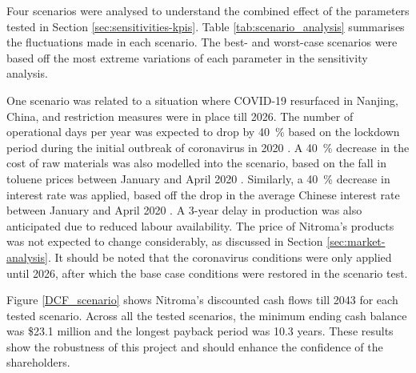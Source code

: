 Four scenarios were analysed to understand the combined effect of the parameters tested in Section \ref{sec:sensitivities-kpis}. Table \ref{tab:scenario_analysis} summarises the fluctuations made in each scenario. The best- and worst-case scenarios were based off the most extreme variations of each parameter in the sensitivity analysis. 

One scenario was related to a situation where COVID-19 resurfaced in Nanjing, China, and restriction measures were in place till 2026. The number of operational days per year was expected to drop by \SI{40}{\percent} based on the lockdown period during the initial outbreak of coronavirus in 2020 \cite{bbc_news_coronavirus_nodate}. A \SI{40}{\percent} decrease in the cost of raw materials was also modelled into the scenario, based on the fall in toluene prices between January and April 2020 \cite{sunsirs_commodity_group_china_2021}. Similarly, a \SI{40}{\percent} decrease in interest rate was applied, based off the drop in the average Chinese interest rate between January and April 2020 \cite{statista_weighted_nodate}. A 3-year delay in production was also anticipated due to reduced labour availability. The price of Nitroma’s products was not expected to change considerably, as discussed in Section \ref{sec:market-analysis}. It should be noted that the coronavirus conditions were only applied until 2026, after which the base case conditions were restored in the scenario test.

Figure \ref{DCF_scenario} shows Nitroma’s discounted cash flows till 2043 for each tested scenario. Across all the tested scenarios, the minimum ending cash balance was \$23.1 million and the longest payback period was 10.3 years. These results show the robustness of this project and should enhance the confidence of the shareholders.
